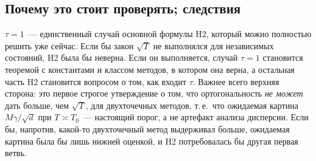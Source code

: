 \documentclass[11pt,a4paper]{article}
\numberwithin{equation}{section}
\theoremstyle{definition}
\theoremstyle{remark}
\begin{document}
\subsection{Почему это стоит проверять; следствия}
$\tau=1$~--- единственный случай основной формулы H2, который можно полностью решить уже сейчас. Если бы закон $\sqrt T$ не выполнялся для независимых состояний, H2 была бы неверна. Если он выполняется, случай $\tau=1$ становится теоремой с константами и классом методов, в котором она верна, а остальная часть H2 становится вопросом о том, как входит $\tau$. Важнее всего верхняя сторона: это первое строгое утверждение о том, что ортогональность \emph{не может} дать больше, чем $\sqrt T$, для двухточечных методов, т.\,е.\ что ожидаемая картина $M\gamma/\sqrt d$ при $T\asymp T_0$~--- настоящий порог, а не артефакт анализа дисперсии. Если бы, напротив, какой-то двухточечный метод выдерживал больше, ожидаемая картина была бы лишь нижней оценкой, и H2 потребовалась бы другая первая ветвь.

\end{document}

